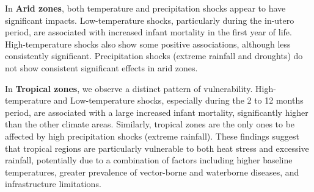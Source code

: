 \documentclass[a4paper]{article}
\begin{document}
In \textbf{Arid zones}, both temperature and precipitation shocks appear to have significant impacts.  Low-temperature shocks, particularly during the in-utero period, are associated with increased infant mortality in the first year of life.  High-temperature shocks also show some positive associations, although less consistently significant.  Precipitation shocks (extreme rainfall and droughts) do not show consistent significant effects in arid zones.

In \textbf{Tropical zones}, we observe a distinct pattern of vulnerability.  High-temperature and Low-temperature shocks, especially during the 2 to 12 months period, are associated with a large increased infant mortality, significantly higher than the other climate areas.  Similarly, tropical zones are the only ones to be affected by high precipitation shocks (extreme rainfall).  These findings suggest that tropical regions are particularly vulnerable to both heat stress and excessive rainfall, potentially due to a combination of factors including higher baseline temperatures, greater prevalence of vector-borne and waterborne diseases, and infrastructure limitations.
\end{document}
